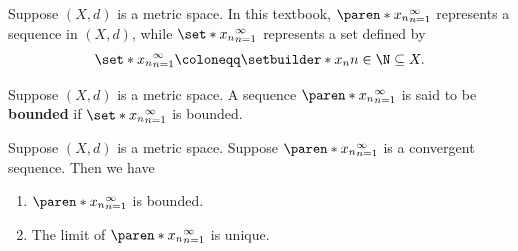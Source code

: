 \begin{remark}
  Suppose $(X, d)$ is a metric space. In this textbook, $\paren*{x_{n}}_{n = 1}^{\infty}$ represents
  a sequence in $(X, d)$, while $\set*{x_{n}}_{n = 1}^{\infty}$ represents a set defined by
  \[
    \set*{x_{n}}_{n = 1}^{\infty} \coloneqq \setbuilder*{x_{n}}{n \in \N} \subseteq X.
  \]
\end{remark}

\begin{definition} \label{an1:def:bounded-sequence}
  Suppose $(X, d)$ is a metric space. A sequence $\paren*{x_{n}}_{n = 1}^{\infty}$
  is said to be \textbf{bounded} if $\set*{x_{n}}_{n = 1}^{\infty}$ is bounded.
\end{definition}

\begin{theorem} \label{an1:thm:convergent-sequence-is-bounded}
  Suppose $(X, d)$ is a metric space. Suppose $\paren*{x_{n}}_{n = 1}^{\infty}$ is a convergent sequence. Then we have
  \begin{enumerate}[label=\textbf{(\Alph*)}]
    \item $\paren*{x_{n}}_{n = 1}^{\infty}$ is bounded.
    \item The limit of $\paren*{x_{n}}_{n = 1}^{\infty}$ is unique.
  \end{enumerate}
\end{theorem}

